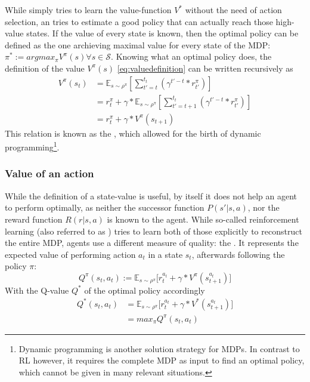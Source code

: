 While  simply tries to learn the value-function $V^*$ without the need of action selection, an  tries to estimate a good policy that can actually reach those high-value states. If the value of every state is known, then the optimal policy can be defined as the one archieving maximal value for every state of the MDP: \mbox{$\pi^* := argmax_\pi V^\pi(s) \forall s \in \mathcal{S}$}. Knowing what an optimal policy does, the definition of the value $V^\pi(s)$ \ref{eq:valuedefinition} can be written recursively as
\begin{align}
	V^\pi(s_t) &= \mathds{E}_{s\sim\rho^\pi} \left[  \sum_{t'=t}^{t_t} ( \gamma^{t'-t} * r^\pi_{t'} ) \right]  \nonumber \\
	&= r_t^\pi + \gamma * \mathds{E}_{s\sim\rho^\pi} \left[  \sum_{t'=t+1}^{t_t} ( \gamma^{t'-t} * r^\pi_{t'} ) \right]  \nonumber \\
	&= r_t^\pi + \gamma * V^\pi(s_{t+1}) \label{statebellman}
\end{align}
This relation is known as the , which allowed for the birth of dynamic programming\footnote{Dynamic programming is another solution strategy for MDPs. In contrast to RL however, it requires the complete MDP as input to find an optimal policy, which cannot be given in many relevant situations.}.

\subsubsection{Value of an action}
While the definition of a state-value is useful, by itself it does not help an agent to perform optimally, as neither the successor function $P(s'|s,a)$, nor the reward function $R(r|s,a)$ is known to the agent. While so-called  reinforcement learning (also referred to as ) tries to learn both of those explicitly to reconstruct the entire MDP,  agents use a different measure of quality: the . It represents the expected value of performing action $a_t$ in a state $s_t$, afterwards following the policy $\pi$:
\begin{equation} \label{eq:1.2}
	Q^\pi(s_t,a_t) :=  \mathds{E}_{s\sim\rho^\pi} \big[ r_t^{a_t} + \gamma * V^\pi(s_{t+1}^{a_t}) \big]
\end{equation}
With the Q-value $Q^*$ of the optimal policy accordingly 
\begin{align*}
	Q^*(s_t,a_t) &=  \mathds{E}_{s\sim\rho^\pi} \big[ r_t^{a_t} + \gamma * V^*(s_{t+1}^{a_t}) \big] \\
	&= max_\pi Q^\pi(s_t,a_t)
\end{align*}

